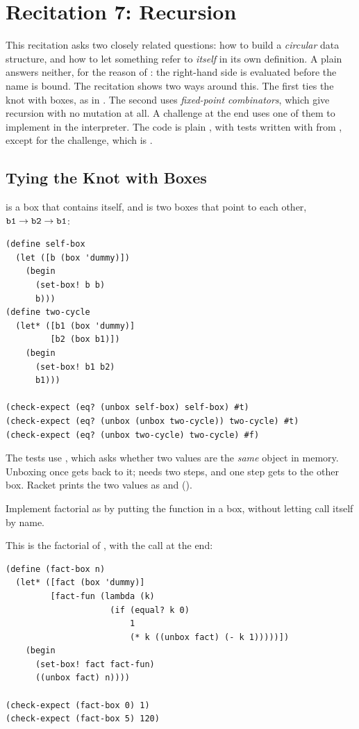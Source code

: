 \section{Recitation 7: Recursion}
\label{sec:rec7}

This recitation asks two closely related questions: how to build a \emph{circular} data structure, and how to let something refer to \emph{itself} in its own definition. A plain  answers neither, for the reason of : the right-hand side is evaluated before the name is bound. The recitation shows two ways around this. The first ties the knot with boxes, as in . The second uses \emph{fixed-point combinators}, which give recursion with no mutation at all. A challenge at the end uses one of them to implement  in the interpreter. The code is plain , with tests written with  from , except for the challenge, which is .

\subsection{Tying the Knot with Boxes}

 is a box that contains itself, and  is two boxes that point to each other, $\texttt{b1} \to \texttt{b2} \to \texttt{b1}$:
\begin{lstlisting}
(define self-box
  (let ([b (box 'dummy)])
    (begin
      (set-box! b b)
      b)))
(define two-cycle
  (let* ([b1 (box 'dummy)]
         [b2 (box b1)])
    (begin
      (set-box! b1 b2)
      b1)))

(check-expect (eq? (unbox self-box) self-box) #t)
(check-expect (eq? (unbox (unbox two-cycle)) two-cycle) #t)
(check-expect (eq? (unbox two-cycle) two-cycle) #f)
\end{lstlisting}
The tests use , which asks whether two values are the \emph{same} object in memory. Unboxing  once gets back to it;  needs two steps, and one step gets to the other box. Racket prints the two values as  and  ().

\begin{exercise}
Implement factorial as  by putting the function in a box, without letting  call itself by name.
\end{exercise}
\begin{solution}
This is the factorial of , with the call  at the end:
\begin{lstlisting}
(define (fact-box n)
  (let* ([fact (box 'dummy)]
         [fact-fun (lambda (k)
                     (if (equal? k 0)
                         1
                         (* k ((unbox fact) (- k 1)))))])
    (begin
      (set-box! fact fact-fun)
      ((unbox fact) n))))

(check-expect (fact-box 0) 1)
(check-expect (fact-box 5) 120)
\end{lstlisting}
\end{solution}

